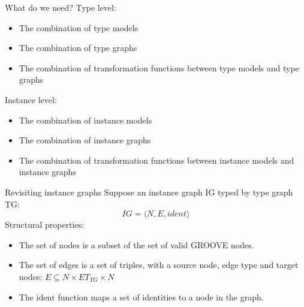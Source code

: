 \begin{frame}{What do we need?}
    Type level:
    \begin{itemize}
        \item The combination of type models
        \item The combination of type graphs
        \item The combination of transformation functions between type models and type graphs
    \end{itemize}
    \vspace{0.25cm}
    Instance level:
    \begin{itemize}
        \item The combination of instance models
        \item \alert<2>{The combination of instance graphs}
        \item The combination of transformation functions between instance models and instance graphs
    \end{itemize}
\end{frame}


\begin{frame}{Revisiting instance graphs}
Suppose an instance graph IG typed by type graph TG:
\begin{equation*}
    IG = \langle N, E, ident \rangle
\end{equation*}\pause
\vspace{0.5cm}
Structural properties:
\begin{itemize}
    \item The set of nodes is a subset of the set of valid GROOVE nodes.
    \item The set of edges is a set of triples, with a source node, edge type and target nodes: $E \subseteq N \times ET_{TG} \times N$
    \item The $\mathrm{ident}$ function maps a set of identities to a node in the graph.
\end{itemize}
\end{frame}

